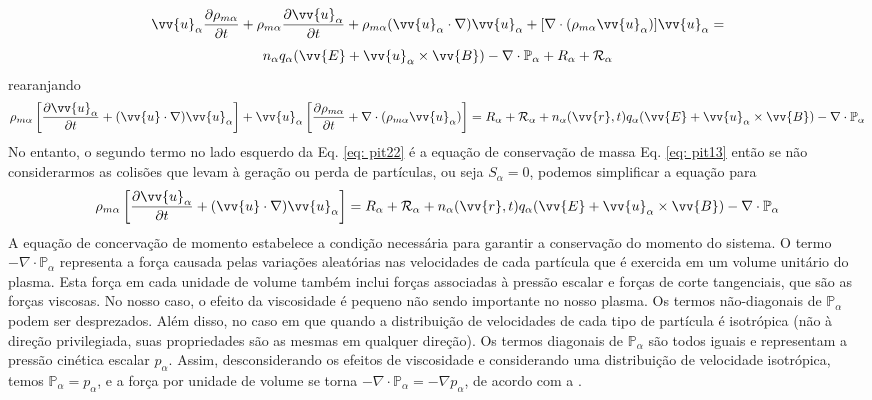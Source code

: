 \documentclass[12pt,oneside,a4paper]{abntex2}
\theoremstyle{definition}  %
\begin{document}
\begin{equation}
\label{eq: pit21}
 \vv{u}_\alpha \frac{\partial \rho_{m\alpha}}{\partial t} + \rho_{m\alpha} \frac{\partial \vv{u}_\alpha}{\partial t}+ \rho_{m\alpha} (\vv{u}_\alpha \cdot \nabla)\vv{u}_\alpha+[\nabla \cdot (\rho_{m\alpha} \vv{u}_\alpha)]\vv{u}_\alpha  =
\end{equation}
\begin{equation*}
n_\alpha q_\alpha (\vv{E} + \vv{u}_\alpha \times \vv{B})-\nabla \cdot \mathbb{P}_\alpha + R_\alpha + \mathcal{R}_\alpha
\end{equation*}
rearanjando
\begin{equation}
\label{eq: pit22}
\rho_{m\alpha} \left[\frac{\partial \vv{u}_\alpha}{\partial t} + (\vv{u} \cdot \nabla)\vv{u}_\alpha \right]+ \vv{u}_\alpha \left[ \frac{\partial \rho_{m\alpha}}{\partial t} + \nabla \cdot (\rho_{m\alpha} \vv{u}_\alpha)  \right] = R_\alpha + \mathcal{R}_\alpha +n_\alpha(\vv{r},t) q_\alpha (\vv{E} + \vv{u}_\alpha \times \vv{B})-\nabla \cdot \mathbb{P}_\alpha 
\end{equation}
No entanto, o segundo termo no lado esquerdo da Eq. \ref{eq: pit22} é a equação de conservação de massa Eq. \ref{eq: pit13} então se não considerarmos as colisões que levam à geração ou perda de partículas, ou seja $S_\alpha = 0$, podemos simplificar a equação para
\begin{equation}
\label{eq: pit23}
\rho_{m\alpha} \left[\frac{\partial \vv{u}_\alpha}{\partial t} + (\vv{u} \cdot \nabla)\vv{u}_\alpha \right] =  R_\alpha + \mathcal{R}_\alpha +n_\alpha(\vv{r},t) q_\alpha (\vv{E} + \vv{u}_\alpha \times \vv{B})-\nabla \cdot \mathbb{P}_\alpha 
\end{equation}
A equação de concervação de momento estabelece a condição necessária para garantir a conservação do momento do sistema. O termo $-\nabla \cdot \mathbb{P}_\alpha $ representa a força causada pelas variações aleatórias nas velocidades de cada partícula que é exercida em um volume unitário do plasma. Esta força em cada unidade de volume também inclui forças associadas à pressão escalar e forças de corte tangenciais, que são as forças viscosas. No nosso  caso, o efeito da viscosidade é pequeno não sendo importante no nosso plasma. Os termos não-diagonais de $\mathbb{P}_\alpha$ podem ser desprezados.  Além disso, no caso em que quando a distribuição de velocidades de cada tipo de partícula é isotrópica (não à direção privilegiada, suas propriedades são as mesmas em qualquer direção). Os termos diagonais de $\mathbb{P}_\alpha$ são todos iguais e representam a pressão cinética escalar $p_\alpha$. Assim, desconsiderando os efeitos de viscosidade e considerando uma distribuição de velocidade isotrópica, temos $\mathbb{P}_\alpha = p_\alpha$, e a força por unidade de volume se torna $-\nabla \cdot \mathbb{P}_\alpha = -\nabla p_\alpha$, de acordo com a \cite[Cap 6]{bittencourt}.
\end{document}
